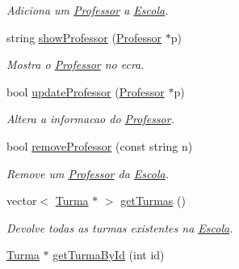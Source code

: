 \begin{DoxyCompactItemize}
\begin{DoxyCompactList}\small\item\em Adiciona um \hyperlink{class_professor}{Professor} a \hyperlink{class_escola}{Escola}. \end{DoxyCompactList}\item 
\hypertarget{class_escola_addc6cd7b85c6fdba76dd536c580c16c8}{string \hyperlink{class_escola_addc6cd7b85c6fdba76dd536c580c16c8}{show\-Professor} (\hyperlink{class_professor}{Professor} $\ast$p)}\label{class_escola_addc6cd7b85c6fdba76dd536c580c16c8}

\begin{DoxyCompactList}\small\item\em Mostra o \hyperlink{class_professor}{Professor} no ecra. \end{DoxyCompactList}\item 
\hypertarget{class_escola_a409612d09d981eb7e6e3a532080d7aed}{bool \hyperlink{class_escola_a409612d09d981eb7e6e3a532080d7aed}{update\-Professor} (\hyperlink{class_professor}{Professor} $\ast$p)}\label{class_escola_a409612d09d981eb7e6e3a532080d7aed}

\begin{DoxyCompactList}\small\item\em Altera a informacao do \hyperlink{class_professor}{Professor}. \end{DoxyCompactList}\item 
\hypertarget{class_escola_ab88ff73f646f14380fdbb5a55bc49882}{bool \hyperlink{class_escola_ab88ff73f646f14380fdbb5a55bc49882}{remove\-Professor} (const string n)}\label{class_escola_ab88ff73f646f14380fdbb5a55bc49882}

\begin{DoxyCompactList}\small\item\em Remove um \hyperlink{class_professor}{Professor} da \hyperlink{class_escola}{Escola}. \end{DoxyCompactList}\item 
\hypertarget{class_escola_acee757e16892f33820b22a7d7749d97d}{vector$<$ \hyperlink{class_turma}{Turma} $\ast$ $>$ \hyperlink{class_escola_acee757e16892f33820b22a7d7749d97d}{get\-Turmas} ()}\label{class_escola_acee757e16892f33820b22a7d7749d97d}

\begin{DoxyCompactList}\small\item\em Devolve todas as turmas existentes na \hyperlink{class_escola}{Escola}. \end{DoxyCompactList}\item 
\hypertarget{class_escola_a5dab98b3f36b81a764b104d9d9a302e8}{\hyperlink{class_turma}{Turma} $\ast$ \hyperlink{class_escola_a5dab98b3f36b81a764b104d9d9a302e8}{get\-Turma\-By\-Id} (int id)}\label{class_escola_a5dab98b3f36b81a764b104d9d9a302e8}


\end{DoxyCompactItemize}
